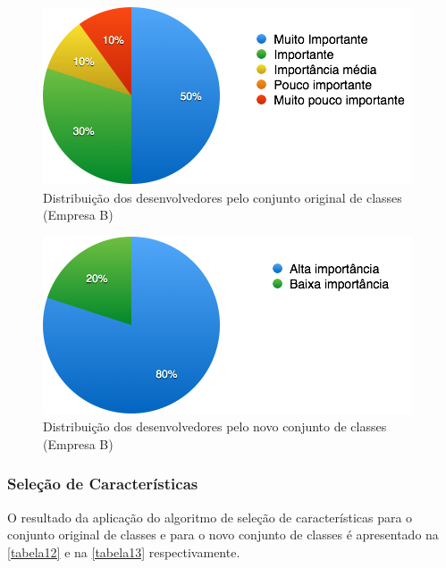 \begin{figure}[p]
	\centering
	\includegraphics[width=\textwidth]{figs/empresa_b/imagem-classe-original.png}
	\caption{\label{fig_11}Distribuição dos desenvolvedores pelo conjunto original de classes (Empresa B)}
\end{figure}

\begin{figure}[p]
	\centering
	\includegraphics[width=\textwidth]{figs/empresa_b/imagem-classe-alternativa.png}
	\caption{\label{fig_12}Distribuição dos desenvolvedores pelo novo conjunto de classes (Empresa B)}
\end{figure}

\subsubsection{Seleção de Características}
O resultado da aplicação do algoritmo de seleção de características para o conjunto original de classes e para o novo conjunto de classes é apresentado na \autoref{tabela12} e na \autoref{tabela13} respectivamente.

